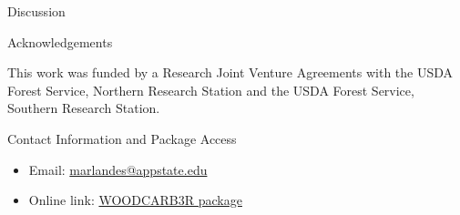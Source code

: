 \documentclass[final]{beamer}\usepackage[]{graphicx}\usepackage[]{color}
\newlength{\onecolwid}
\begin{document}
\begin{frame}[t]
\begin{columns}[t]
\begin{column}{\onecolwid}
\begin{block}{Discussion}
\end{block}





\begin{block}{Acknowledgements}

This work was funded by a Research Joint Venture Agreements with the USDA Forest Service, Northern Research Station and the USDA Forest Service, Southern Research Station.

\end{block}



\begin{alertblock}{Contact Information and Package Access}

\begin{itemize}
\item Email: \href{marlandes@appstate.edu}{marlandes@appstate.edu}
\item Online link: \href{http://benjones2.github.io/WOODCARB3R/}{WOODCARB3R package}
\end{itemize}
\vspace{0ex}
\begin{center}
\end{center}


\end{alertblock}
\end{column}
\end{columns}
\end{frame}
\end{document}

